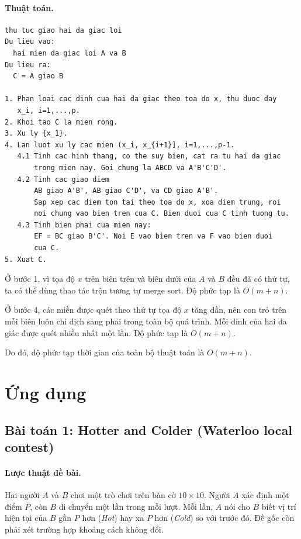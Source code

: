 \documentclass[11pt]{article}
\begin{document}
\paragraph{Thuật toán.}
\begin{verbatim}
thu tuc giao hai da giac loi
Du lieu vao:
  hai mien da giac loi A va B
Du lieu ra:
  C = A giao B

1. Phan loai cac dinh cua hai da giac theo toa do x, thu duoc day
   x_i, i=1,...,p.
2. Khoi tao C la mien rong.
3. Xu ly {x_1}.
4. Lan luot xu ly cac mien (x_i, x_{i+1}], i=1,...,p-1.
   4.1 Tinh cac hinh thang, co the suy bien, cat ra tu hai da giac
       trong mien nay. Goi chung la ABCD va A'B'C'D'.
   4.2 Tinh cac giao diem
       AB giao A'B', AB giao C'D', va CD giao A'B'.
       Sap xep cac diem ton tai theo toa do x, xoa diem trung, roi
       noi chung vao bien tren cua C. Bien duoi cua C tinh tuong tu.
   4.3 Tinh bien phai cua mien nay:
       EF = BC giao B'C'. Noi E vao bien tren va F vao bien duoi
       cua C.
5. Xuat C.
\end{verbatim}

Ở bước 1, vì tọa độ \(x\) trên biên trên và biên dưới của \(A\) và \(B\) đều
đã có thứ tự, ta có thể dùng thao tác trộn tương tự merge sort. Độ phức tạp
là \(O(m+n)\).

Ở bước 4, các miền được quét theo thứ tự tọa độ \(x\) tăng dần, nên con trỏ
trên mỗi biên luôn chỉ dịch sang phải trong toàn bộ quá trình. Mỗi đỉnh của
hai đa giác được quét nhiều nhất một lần. Độ phức tạp là \(O(m+n)\).

Do đó, độ phức tạp thời gian của toàn bộ thuật toán là \(O(m+n)\).

\section{Ứng dụng}

\subsection{Bài toán 1: Hotter and Colder (Waterloo local contest)}

\paragraph{Lược thuật đề bài.}
Hai người \(A\) và \(B\) chơi một trò chơi trên bàn cờ \(10\times 10\). Người
\(A\) xác định một điểm \(P\), còn \(B\) di chuyển một lần trong mỗi lượt.
Mỗi lần, \(A\) nói cho \(B\) biết vị trí hiện tại của \(B\) gần \(P\) hơn
(\textit{Hot}) hay xa \(P\) hơn (\textit{Cold}) so với trước đó. Đề gốc còn
phải xét trường hợp khoảng cách không đổi.
\end{document}
